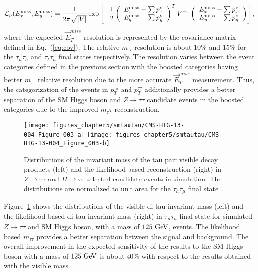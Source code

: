 \begin{equation}
\mathcal{L}_{\nu} (E_{x}^{\rm miss}, E_{y}^{\rm miss}) = \frac{1}{2 \pi \sqrt{\vert V \vert}} 
 \exp \left[ -\frac{1}{2}
 \left( \begin{array}{c} E_{x}^{\rm miss} - \sum p_{x}^{\nu} \\ E_{y}^{\rm miss} - \sum p_{y}^{\nu} \end{array} \right)^{T}
 V^{-1} 
 \left( \begin{array}{c} E_{x}^{\rm miss} - \sum p_{x}^{\nu} \\ E_{y}^{\rm miss} - \sum p_{y}^{\nu} \end{array} \right)
\right],
\end{equation}
where the expected $\vec{E}_{T}^{miss}$ resolution is represented by the covariance matrix defined in Eq.~(\ref{eq:cov}). The relative $m_{\tau\tau}$ resolution is about $10\%$ and $15\%$ for the $\tau_h\tau_h$ and $\tau_{\ell}\tau_h$ final states respectively. The resolution varies between the event categories defined in the previous section with the boosted categories having better $m_{\tau\tau}$ relative resolution due to the more accurate $\vec{E}_{T}^{miss}$ measurement. Thus, the categorization of the events in $p_{T}^{\tau_h}$ and  $p_{T}^{\tau\tau}$ additionally provides a better separation of the SM Higgs boson and $Z\rightarrow \tau\tau$ candidate events in the boosted categories due to the improved $m_\tau\tau$ reconstruction.   
\begin{figure}[htbp]
\centering
\texttt{[image: figures\_chapter5/smtautau/CMS-HIG-13-004\_Figure\_003-a]}
\texttt{[image: figures\_chapter5/smtautau/CMS-HIG-13-004\_Figure\_003-b]}
\caption{Distributions of the invariant mass of the tau pair visible decay products (left) and the likelihood based reconstruction (right) in $Z \rightarrow \tau\tau$ and $H \rightarrow \tau\tau$ selected candidate events in simulation. The distributions are normalized to unit area for the $\tau_{h}\tau_{\mu}$ final state~\cite{Chatrchyan:2014nva}.}
\label{fig:svfit}
\end{figure}
Figure~\ref{fig:svfit} shows the distributions of the visible di-tau invariant mass (left) and the likelihood based di-tau invariant mass (right) in $\tau_{\mu}\tau_h$ final state for simulated $Z \rightarrow \tau\tau$ and SM Higgs boson, with a mass of $125~\mathrm{Ge\kern -0.1em V}$, events. The likelihood based $m_{\tau\tau}$ provides a better separation between the signal and background. The overall improvement in the expected sensitivity of the results to the SM Higgs boson with a mass of $125~\mathrm{Ge\kern -0.1em V}$ is about $40\%$ with respect to the results obtained with the visible mass.  

